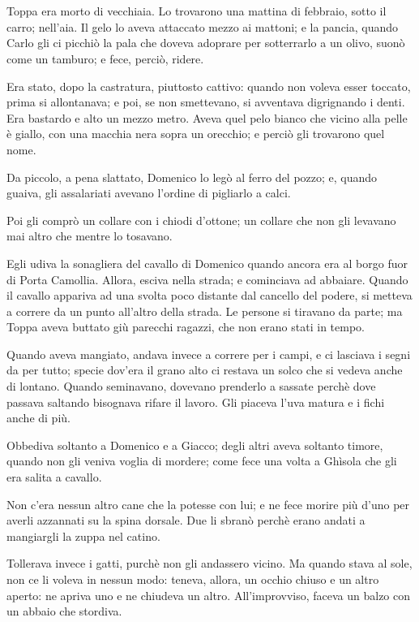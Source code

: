 \chapter{}

Toppa era morto di vecchiaia. Lo trovarono una mattina di febbraio, sotto il carro; nell’aia. Il gelo lo aveva attaccato mezzo ai mattoni; e la pancia, quando Carlo gli ci picchiò la pala che doveva adoprare per sotterrarlo a un olivo, suonò come un tamburo; e fece, perciò, ridere.

Era stato, dopo la castratura, piuttosto cattivo: quando non voleva esser toccato, prima si allontanava; e poi, se non smettevano, si avventava digrignando i denti. Era bastardo e alto un mezzo metro. Aveva quel pelo bianco che vicino alla pelle è giallo, con una macchia nera sopra un orecchio; e perciò gli trovarono quel nome.

Da piccolo, a pena slattato, Domenico lo legò al ferro del pozzo; e, quando guaiva, gli assalariati avevano l’ordine di pigliarlo a calci.

Poi gli comprò un collare con i chiodi d'ottone; un collare che non gli levavano mai altro che mentre lo tosavano.

Egli udiva la sonagliera del cavallo di Domenico quando ancora era al borgo fuor di Porta Camollia. Allora, esciva nella strada; e cominciava ad abbaiare. Quando il cavallo appariva ad una svolta poco distante dal cancello del podere, si metteva a correre da un punto all'altro della strada. Le persone si tiravano da parte; ma Toppa aveva buttato giù parecchi ragazzi, che non erano stati in tempo.

Quando aveva mangiato, andava invece a correre per i campi, e ci lasciava i segni da per tutto; specie dov'era il grano alto ci restava un solco che si vedeva anche di lontano. Quando seminavano, dovevano prenderlo a sassate perchè dove passava saltando bisognava rifare il lavoro. Gli piaceva l'uva matura e i fichi anche di più.

Obbediva soltanto a Domenico e a Giacco; degli altri aveva soltanto timore, quando non gli veniva voglia di mordere; come fece una volta a Ghìsola che gli era salita a cavallo.

Non c’era nessun altro cane che la potesse con lui; e ne fece morire più d’uno per averli azzannati su la spina dorsale. Due li sbranò perchè erano andati a mangiargli la zuppa nel catino.

Tollerava invece i gatti, purchè non gli andassero vicino. Ma quando stava al sole, non ce li voleva in nessun modo: teneva, allora, un occhio chiuso e un altro aperto: ne apriva uno e ne chiudeva un altro. All’improvviso, faceva un balzo con un abbaio che stordiva.

